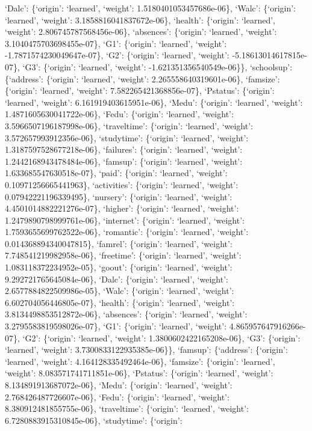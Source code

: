\documentclass[
]{article}
\begin{document}
`Dalc': \{`origin': `learned', `weight': 1.5180401053457686e-06\},
`Walc': \{`origin': `learned', `weight': 3.1858816041837672e-06\},
`health': \{`origin': `learned', `weight': 2.806745787568456e-06\},
`absences': \{`origin': `learned', `weight': 3.1040475703698455e-07\},
`G1': \{`origin': `learned', `weight': -1.7871574230049647e-07\}, `G2':
\{`origin': `learned', `weight': -5.18613014617815e-07\}, `G3':
\{`origin': `learned', `weight': -1.621351356540549e-06\}\},
`schoolsup': \{`address': \{`origin': `learned', `weight':
2.265558640319601e-06\}, `famsize': \{`origin': `learned', `weight':
7.582265421368856e-07\}, `Pstatus': \{`origin': `learned', `weight':
6.161919403615951e-06\}, `Medu': \{`origin': `learned', `weight':
1.4871605630041722e-06\}, `Fedu': \{`origin': `learned', `weight':
3.5966507196187998e-06\}, `traveltime': \{`origin': `learned', `weight':
3.572657993912356e-06\}, `studytime': \{`origin': `learned', `weight':
1.3187597528677218e-06\}, `failures': \{`origin': `learned', `weight':
1.2442168943478484e-06\}, `famsup': \{`origin': `learned', `weight':
1.633685547630518e-07\}, `paid': \{`origin': `learned', `weight':
0.10971256665441963\}, `activities': \{`origin': `learned', `weight':
0.07942221196339495\}, `nursery': \{`origin': `learned', `weight':
4.4501014882221276e-07\}, `higher': \{`origin': `learned', `weight':
1.2479890798999761e-06\}, `internet': \{`origin': `learned', `weight':
1.7593655699762522e-06\}, `romantic': \{`origin': `learned', `weight':
0.014368894340047815\}, `famrel': \{`origin': `learned', `weight':
7.748541219982958e-06\}, `freetime': \{`origin': `learned', `weight':
1.083118372234952e-05\}, `goout': \{`origin': `learned', `weight':
9.292721765645084e-06\}, `Dalc': \{`origin': `learned', `weight':
2.6577884822509986e-05\}, `Walc': \{`origin': `learned', `weight':
6.602704056446805e-07\}, `health': \{`origin': `learned', `weight':
3.8134498853512872e-06\}, `absences': \{`origin': `learned', `weight':
3.2795583819598026e-07\}, `G1': \{`origin': `learned', `weight':
4.865957647916266e-07\}, `G2': \{`origin': `learned', `weight':
1.3800602422165208e-06\}, `G3': \{`origin': `learned', `weight':
3.7300833122935385e-06\}\}, `famsup': \{`address': \{`origin':
`learned', `weight': 4.164128335492464e-06\}, `famsize': \{`origin':
`learned', `weight': 8.083571741711851e-06\}, `Pstatus': \{`origin':
`learned', `weight': 8.134891913687072e-06\}, `Medu': \{`origin':
`learned', `weight': 2.768426487726607e-06\}, `Fedu': \{`origin':
`learned', `weight': 8.380912481855755e-06\}, `traveltime': \{`origin':
`learned', `weight': 6.7280883915310845e-06\}, `studytime': \{`origin':
\end{document}
